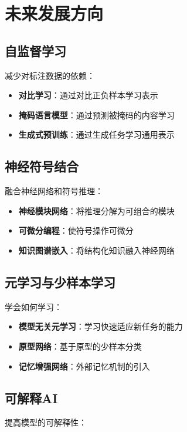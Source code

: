 \section{未来发展方向}

\subsection{自监督学习}

减少对标注数据的依赖：

\begin{itemize}
\item \textbf{对比学习}：通过对比正负样本学习表示
\item \textbf{掩码语言模型}：通过预测被掩码的内容学习
\item \textbf{生成式预训练}：通过生成任务学习通用表示
\end{itemize}

\subsection{神经符号结合}

融合神经网络和符号推理：

\begin{itemize}
\item \textbf{神经模块网络}：将推理分解为可组合的模块
\item \textbf{可微分编程}：使符号操作可微分
\item \textbf{知识图谱嵌入}：将结构化知识融入神经网络
\end{itemize}

\subsection{元学习与少样本学习}

学会如何学习：

\begin{itemize}
\item \textbf{模型无关元学习}：学习快速适应新任务的能力
\item \textbf{原型网络}：基于原型的少样本分类
\item \textbf{记忆增强网络}：外部记忆机制的引入
\end{itemize}

\subsection{可解释AI}

提高模型的可解释性：

